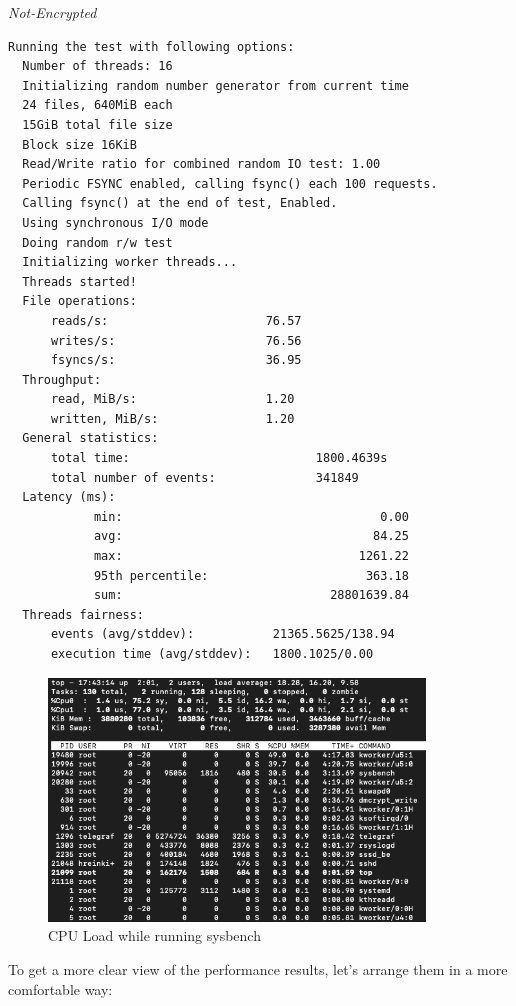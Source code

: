 \noindent\begin{minipage}[t]{0.45\linewidth}
  \centering
  \textit{Not-Encrypted}
  \begin{lstlisting}[basicstyle=\tiny,frame=single, label=cpu_test2]
  Running the test with following options:
  Number of threads: 16
  Initializing random number generator from current time
  24 files, 640MiB each
  15GiB total file size
  Block size 16KiB
  Read/Write ratio for combined random IO test: 1.00
  Periodic FSYNC enabled, calling fsync() each 100 requests.
  Calling fsync() at the end of test, Enabled.
  Using synchronous I/O mode
  Doing random r/w test
  Initializing worker threads...
  Threads started!
  File operations:
      reads/s:                      76.57
      writes/s:                     76.56
      fsyncs/s:                     36.95
  Throughput:
      read, MiB/s:                  1.20
      written, MiB/s:               1.20
  General statistics:
      total time:                          1800.4639s
      total number of events:              341849
  Latency (ms):
            min:                                    0.00
            avg:                                   84.25
            max:                                 1261.22
            95th percentile:                      363.18
            sum:                             28801639.84
  Threads fairness:
      events (avg/stddev):           21365.5625/138.94
      execution time (avg/stddev):   1800.1025/0.00
  \end{lstlisting}
\end{minipage}

\begin{figure}
  \includegraphics[width=10cm]{images/image5.png}
  \centering
  \caption{CPU Load while running sysbench}
\end{figure}

\newpage
To get a more clear view of the performance results, let's arrange them in a more comfortable way:

